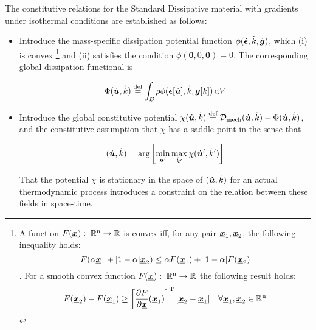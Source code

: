 The constitutive relations for the Standard Dissipative material with 
gradients under isothermal conditions are established as follows:
\begin{itemize}
  \item Introduce the mass-specific dissipation potential function 
    $\phi(\dot{\bm{\epsilon}},\dot{k},\dot{\bm {g}})$, which (i) is convex
    \footnote{A function $F(\underline{\mbox{\boldmath $x$}}):\;{\mathbb{R}}^{\mathrm{n}}\rightarrow{\mathbb{R}}$ is convex
    iff, for any pair $\underline{\mbox{\boldmath $x$}}_1, \underline{\mbox{\boldmath $x$}}_2$, the following inequality holds: 
    \[F(\alpha\underline{\mbox{\boldmath $x$}}_1+[1-\alpha]\underline{\mbox{\boldmath $x$}}_2)\leq\alpha F(\underline{\mbox{\boldmath $x$}}_1)+[1-\alpha]F(\underline{\mbox{\boldmath $x$}}_2)\].
    For a smooth convex function $F(\underline{\mbox{\boldmath $x$}}):\;{\mathbb{R}}^{\mathrm{n}}\rightarrow{\mathbb{R}}$ 
    the following result holds: 
    \[ F(\underline{\mbox{\boldmath $x$}}_2)- F(\underline{\mbox{\boldmath $x$}}_1)\geq
    \left[\frac{\partial F}{\partial \underline{\mbox{\boldmath $x$}}}(\underline{\mbox{\boldmath $x$}}_1)\right]^{\mathrm{T}}
    [\underline{\mbox{\boldmath $x$}}_2-\underline{\mbox{\boldmath $x$}}_1]\quad\forall\underline{\mbox{\boldmath $x$}}_1, \underline{\mbox{\boldmath $x$}}_2\in{\mathbb{R}}^{\mathrm{n}}\]
    } 
    and (ii) satisfies the condition $\phi(\bm{0},0,\bm{0})=0$. 
    The corresponding global dissipation functional is

    $$ \Phi(\dot{\bm {u}},\dot{k}) \stackrel{\text{def}}{=} \int_{\mathcal{B}}  \rho\phi(\bm{\epsilon}[\dot{\bm {u}}],\dot{k},\bm {g}[\dot{k}])  \mathop{}\!\mathrm{d} V $$

  \item Introduce the global constitutive potential $\chi(\dot{\bm {u}},\dot{k})\stackrel{\text{def}}{=} 
    {\mathcal D}_{\mathrm{mech}}(\dot{\bm {u}},\dot{k})-\Phi(\dot{\bm {u}},\dot{k})$, and 
    the constitutive assumption that $\chi$ has a saddle point in the sense that

    $$ (\dot{\bm {u}},\dot{k}) = \arg\left[\min_{\dot{\bm {u}}'}\max_{\dot{k}'} \chi(\dot{\bm {u}}',\dot{k}') \right]$$

    That the potential $\chi$ is stationary in the space of $(\dot{\bm {u}},\dot{k})$
     for an actual thermodynamic process introduces a constraint on the relation 
     between these fields in space-time.
\end{itemize}

